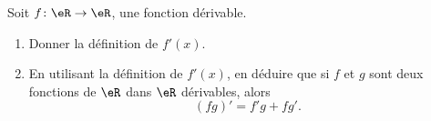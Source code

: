 \begin{exercice}\label{exoJanvier009}

Soit $f\colon \eR\to \eR$, une fonction dérivable.

\begin{enumerate}

\item
Donner la définition de $f'(x)$.

\item
En utilisant la définition de $f'(x)$, en déduire que si $f$ et $g$ sont deux fonctions de $\eR$ dans $\eR$ dérivables, alors
\begin{equation}
	(fg)'=f'g+fg'.
\end{equation}

\end{enumerate}


\end{exercice}
